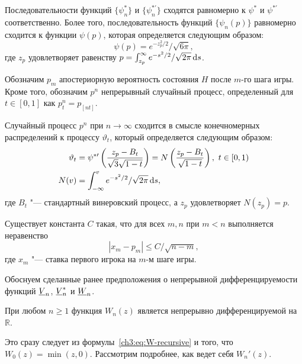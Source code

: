 {\begin{proposition}
Последовательности функций $\{\psi^*_n\}$ и $\{\psi^{*\prime}_n\}$ сходятся равномерно к $\psi^*$ и $\psi^{*\prime}$ соответственно.
Более того, последовательность функций $\{\psi_n(p)\}$ равномерно сходится к функции $\psi(p)$, которая определяется следующим образом:
\begin{equation*}
  \psi(p) = e^{-z_p^2/2}/\sqrt{6\pi},
\end{equation*}
где $z_p$ удовлетворяет равенству $p = \int_{z_p}^\infty e^{-s^2/2}/\sqrt{2\pi} \mathop{}\!\mathrm{d} s$.
\end{proposition}

Обозначим $p_m$ апостериорную вероятность состояния $H$ после $m$-го шага игры.
Кроме того, обозначим $p^n$ непрерывный случайный процесс, определенный для $t \in [0, 1]$ как $p^n_t = p_{[nt]}$.

\begin{proposition}
  Случайный процесс $p^n$ при $n \rightarrow \infty$ сходится в смысле конечномерных распределений к процессу $\vartheta_t$, который определяется следующим образом:
  \begin{align*}
    \vartheta_t &= \psi^{*\prime} \left(
      \frac{z_p - B_t}{\sqrt{3}\sqrt{1-t}}
    \right) =
    N\left( \frac{z_p - B_t}{\sqrt{1-t}} \right),\ t \in [0, 1)\\
    N(v) &= \int_{-\infty}^v e^{-s^2/2}/\sqrt{2\pi} \mathop{}\!\mathrm{d} s,
  \end{align*}
  где $B_t$ "--- стандартный винеровский процесс, а $z_p$ удовлетворяет $N(z_p) = p$.
\end{proposition}

\begin{proposition}
  Существует константа $C$ такая, что для всех $m, n$ при $m < n$ выполняется неравенство
  \begin{equation*}
    | x_m - p_m | \leq C / \sqrt{n - m},
  \end{equation*}
  где $x_m$ "--- ставка первого игрока на $m$-м шаге игры.
\end{proposition}

Обоснуем сделанные ранее предположения о непрерывной дифференцируемости функций $\LV{n}$, $\LV[*]{n}$ и $\LW{n}$.

\begin{proposition}
  При любом $n \geqslant 1$ функция $W_n(z)$ является непрерывно дифференцируемой на $\mathbb{R}$.
\end{proposition}
Это сразу следует из формулы~\eqref{ch3:eq:W-recursive} и того, что $W_0(z) = \min(z, 0)$.
Рассмотрим подробнее, как ведет себя $W_n'(z)$.

}
